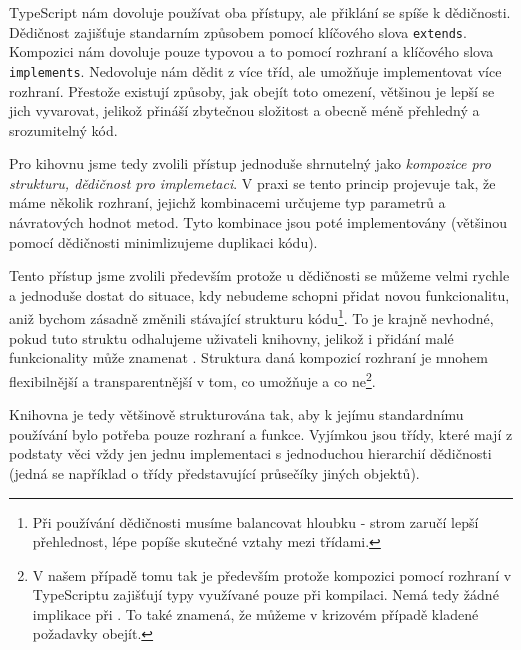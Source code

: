 TypeScript nám dovoluje používat oba přístupy, ale přiklání se spíše k dědičnosti.
Dědičnost zajišťuje standarním způsobem pomocí klíčového slova \texttt{extends}\cite{mdn:extends}.
Kompozici nám dovoluje pouze typovou a to pomocí rozhraní a klíčového slova \texttt{implements}\cite{TypeScript:classes}.
Nedovoluje nám dědit z více tříd, ale umožňuje implementovat více rozhraní\cite{TypeScript:classes}.
Přestože existují způsoby, jak obejít toto omezení\cite{TypeScript:mixins}, většinou je lepší se jich vyvarovat, jelikož přináší zbytečnou složitost a obecně méně přehledný a srozumitelný kód.

Pro kihovnu jsme tedy zvolili přístup jednoduše shrnutelný jako \textit{kompozice pro strukturu, dědičnost pro implemetaci}.
V praxi se tento princip projevuje tak, že máme několik rozhraní, jejichž kombinacemi určujeme typ parametrů a návratových hodnot metod.
Tyto kombinace jsou poté implementovány (většinou pomocí dědičnosti minimlizujeme duplikaci kódu).

Tento přístup jsme zvolili především protože u dědičnosti se můžeme velmi rychle a jednoduše dostat do situace, kdy nebudeme schopni přidat novou funkcionalitu, aniž bychom zásadně změnili stávající strukturu kódu\footnote{Při používání dědičnosti musíme balancovat hloubku  -  strom zaručí lepší přehlednost,  lépe popíše skutečné vztahy mezi třídami.}.
To je krajně nevhodné, pokud tuto struktu odhalujeme uživateli knihovny, jelikož i přidání malé funkcionality může znamenat .
Struktura daná kompozicí rozhraní je mnohem flexibilnější a transparentnější v tom, co umožňuje a co ne\footnote{V našem případě tomu tak je především protože kompozici pomocí rozhraní v TypeScriptu zajišťují typy využívané pouze při kompilaci. Nemá tedy žádné implikace při . To také znamená, že můžeme v krizovém případě kladené požadavky obejít.}.

Knihovna je tedy většinově strukturována tak, aby k jejímu standardnímu používání bylo potřeba  pouze rozhraní a funkce.
Vyjímkou jsou třídy, které mají z podstaty věci vždy jen jednu implementaci s jednoduchou hierarchií dědičnosti (jedná se například o třídy představující průsečíky jiných objektů)\cite{geometryjs:source:geometryObjects:intersections}.
